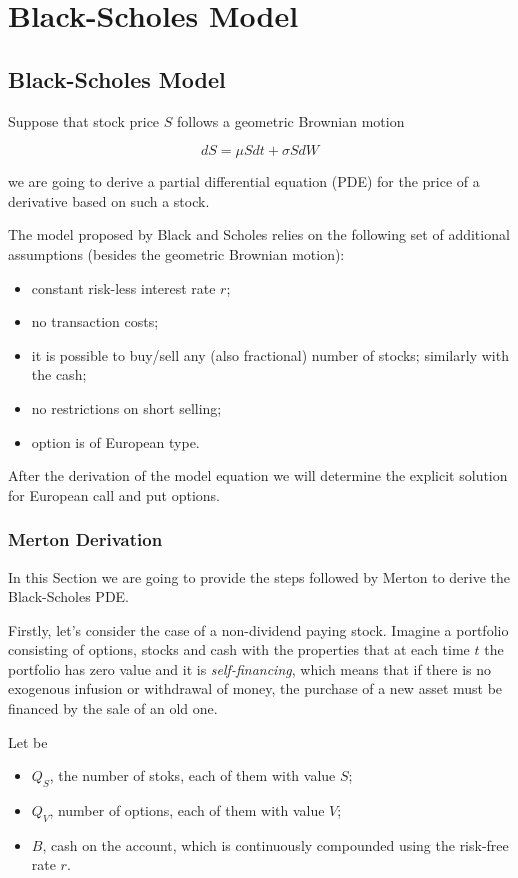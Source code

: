 \chapter{Black-Scholes Model}
\label{ch:BS}

\section{Black-Scholes Model}
Suppose that stock price $S$ follows a geometric Brownian motion

\begin{equation}
dS = \mu Sdt + \sigma SdW
\label{eq:bs_gbm}
\end{equation}

we are going to derive a partial differential equation (PDE) for the price of a derivative based on such a stock.

The model proposed by Black and Scholes relies on the following set of additional assumptions (besides the geometric Brownian motion):
\begin{itemize}
\tightlist 
\item constant risk-less interest rate $r$;
\item no transaction costs;
\item it is possible to buy/sell any (also fractional) number of stocks; similarly with the cash;
\item no restrictions on short selling;
\item option is of European type.
\end{itemize}

After the derivation of the model equation we will determine the explicit solution for European call and put options.

\subsection{Merton Derivation}
In this Section we are going to provide the steps followed by Merton to derive the Black-Scholes PDE.

Firstly, let's consider the case of a non-dividend paying stock. Imagine a portfolio consisting of options, stocks and cash with the properties that at each time $t$ the portfolio has zero value and it is \emph{self-financing}, which means that if there is no exogenous infusion or withdrawal of money, the purchase of a new asset must be financed by the sale of an old one.

Let be 
\begin{itemize}
\item $Q_S$, the number of stoks, each of them with value $S$;
\item $Q_V$, number of options, each of them with value $V$;
\item $B$, cash on the account, which is continuously compounded using the risk-free rate $r$.
\end{itemize}

